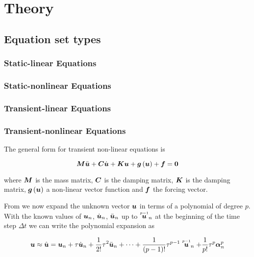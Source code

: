 \clearemptydoublepage
\chapter{Theory}
\label{cha:theory}

\section{Equation set types}

\subsection{Static-linear Equations}

\subsection{Static-nonlinear Equations}

\subsection{Transient-linear Equations}

\subsection{Transient-nonlinear Equations}

The general form for transient non-linear equations is

\begin{equation}
  \matr{M}\ddot{\vect{u}}+\matr{C}\dot{\vect{u}}+\matr{K}\vect{u}+\fnof{\vect{g}}{\vect{u}}+\vect{f}=\vect{0}
  \label{eqn:generaltransientnonlinear}
\end{equation}

where $\matr{M}$ is the mass matrix, $\matr{C}$ is the damping matrix,
$\matr{K}$ is the damping matrix, $\fnof{\vect{g}}{\vect{u}}$ a non-linear vector function and $\vect{f}$ the
forcing vector.

From \cite{zienkiewicz:2006_1} we now expand the unknown vector $\vect{u}$ in terms of a polynomial of degree
$p$. With the known values of $\vect{u}_{n}$, $\dot{\vect{u}}_{n}$,
$\ddot{\vect{u}}_{n}$ up to $\symover{p-1}{\vect{u}}_{n}$ at the beginning of
the time step $\Delta t$ we can write the polynomial expansion as

\begin{equation}
  \vect{u}\approx\hat{\vect{u}}=\vect{u}_{n}+\tau\dot{\vect{u}}_{n}+\frac{1}{2!}\tau^{2}\ddot{\vect{u}}_{n}+\cdots+
  \dfrac{1}{\factorial{p-1}}\tau^{p-1}\symover{p-1}{\vect{u}}_{n}+\dfrac{1}{p!}\tau^{p}\vect{\alpha}^{p}_{n}
  \label{eqn:timepolyexpansion}
\end{equation}

